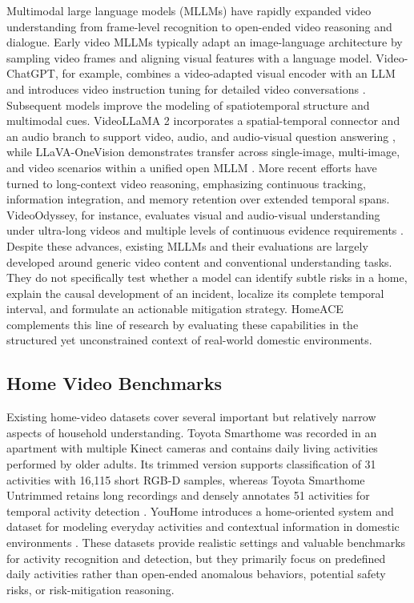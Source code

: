 \documentclass{article} %
\begin{document}
Multimodal large language models (MLLMs) have rapidly expanded video understanding from frame-level recognition to open-ended video reasoning and dialogue. Early video MLLMs typically adapt an image-language architecture by sampling video frames and aligning visual features with a language model. Video-ChatGPT, for example, combines a video-adapted visual encoder with an LLM and introduces video instruction tuning for detailed video conversations \citep{Maaz2024VideoChatGPT}. Subsequent models improve the modeling of spatiotemporal structure and multimodal cues. VideoLLaMA 2 incorporates a spatial-temporal connector and an audio branch to support video, audio, and audio-visual question answering \citep{Cheng2024VideoLLaMA2}, while LLaVA-OneVision demonstrates transfer across single-image, multi-image, and video scenarios within a unified open MLLM \citep{Li2024LLaVAOneVision}. More recent efforts have turned to long-context video reasoning, emphasizing continuous tracking, information integration, and memory retention over extended temporal spans. VideoOdyssey, for instance, evaluates visual and audio-visual understanding under ultra-long videos and multiple levels of continuous evidence requirements \citep{He2026VideoOdyssey}. Despite these advances, existing MLLMs and their evaluations are largely developed around generic video content and conventional understanding tasks. They do not specifically test whether a model can identify subtle risks in a home, explain the causal development of an incident, localize its complete temporal interval, and formulate an actionable mitigation strategy. HomeACE complements this line of research by evaluating these capabilities in the structured yet unconstrained context of real-world domestic environments.

\subsection{Home Video Benchmarks}

Existing home-video datasets cover several important but relatively narrow aspects of household understanding. Toyota Smarthome was recorded in an apartment with multiple Kinect cameras and contains daily living activities performed by older adults. Its trimmed version supports classification of 31 activities with 16,115 short RGB-D samples, whereas Toyota Smarthome Untrimmed retains long recordings and densely annotates 51 activities for temporal activity detection \citep{Das2019ToyotaSmarthome,Dai2022ToyotaSmarthomeUntrimmed}. YouHome introduces a home-oriented system and dataset for modeling everyday activities and contextual information in domestic environments \citep{Pan2022YouHome}. These datasets provide realistic settings and valuable benchmarks for activity recognition and detection, but they primarily focus on predefined daily activities rather than open-ended anomalous behaviors, potential safety risks, or risk-mitigation reasoning.
\end{document}
